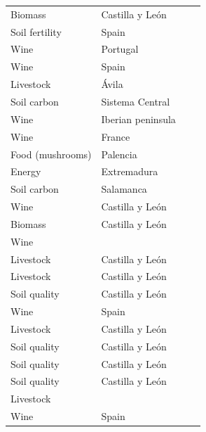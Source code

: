 {\begin{longtable}{llll}
Biomass & Castilla y León & \citet{Lainaetal2013ProductivityCost}\\
Soil fertility & Spain & \citet{CampoGallardo2012ComparisonCation}\\
Wine & Portugal & \citet{Jordaoetal2012AntioxidantCapacity}\\
Wine & Spain & \citet{Gallegoetal2012PhenolicCompounds}\\
Livestock & Ávila & \citet{Nunezetal2012LivestockManagement}\\
Soil carbon & Sistema Central & \citet{DiazPinesetal2011DoesTree}\\
Wine & Iberian peninsula & \citet{Alanonetal2011InfluenceGeographical}\\
Wine & France & \citet{FernandezdeSimonetal2010CharacterizationVolatile}\\
Food (mushrooms) & Palencia & \citet{OriadeRuedaetal2010CouldArtificial}\\
Energy & Extremadura & \citet{Mirandaetal2009EnergeticCharacterization}\\
Soil carbon & Salamanca & \citet{Turrionetal2009CarbonAccumulation}\\
Wine & Castilla y León & \citet{RodriguezBencomoetal2008ImportanceChip}\\
Biomass & Castilla y León & \citet{RioSterba2009ComparingVolume}\\
Wine &  & \citet{FernandezdeSimonetal2009VolatileCompounds}\\
Livestock & Castilla y León & \citet{Doceetal2009EffectAdministration}\\
Livestock & Castilla y León & \citet{Ammaretal2009FeedingQuebracho}\\
Soil quality & Castilla y León & \citet{Tarregaetal2009AbandonmentManagement}\\
Wine & Spain & \citet{FernandezdeSimonetal2008VolatileCompounds}\\
Livestock & Castilla y León & \citet{Ammaretal2008VitroDigestibility}\\
Soil quality & Castilla y León & \citet{Turrionetal2008SoilAvailability}\\
Soil quality & Castilla y León & \citet{Menendezetal2007HydrogeochemicalBalance}\\
Soil quality & Castilla y León & \citet{Tarregaetal2006ForestStructure}\\
Livestock &  & \citet{Doceetal2007EffectImmature}\\
Wine & Spain & \citet{FernandezdeSimonetal2006ChemicalCharacterization}\\

\end{longtable}}
